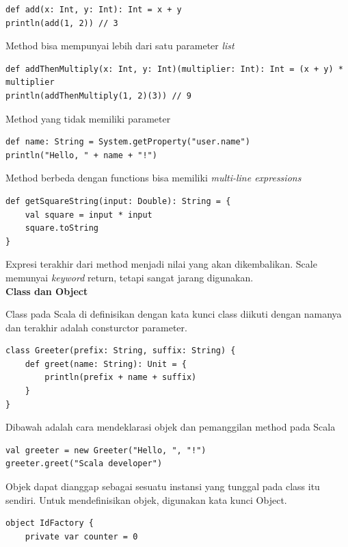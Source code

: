 \documentclass[a4paper,twoside]{article}
\begin{document}
\begin{enumerate}
\begin{verbatim}
def add(x: Int, y: Int): Int = x + y 
println(add(1, 2)) // 3 
\end{verbatim}

Method bisa mempunyai lebih dari satu parameter \textit{list} 

\begin{verbatim}
def addThenMultiply(x: Int, y: Int)(multiplier: Int): Int = (x + y) * multiplier 
println(addThenMultiply(1, 2)(3)) // 9 
\end{verbatim}


Method yang tidak memiliki parameter

\begin{verbatim}
def name: String = System.getProperty("user.name")
println("Hello, " + name + "!")
\end{verbatim}
Method berbeda dengan functions bisa memiliki \textit{multi-line expressions}

\begin{verbatim}
def getSquareString(input: Double): String = {
    val square = input * input
    square.toString
}
\end{verbatim}

Expresi terakhir dari method menjadi nilai yang akan dikembalikan. Scale memunyai \textit{keyword} return, tetapi sangat jarang digunakan.\\

\textbf{Class dan Object}

Class pada Scala di definisikan dengan kata kunci class diikuti dengan namanya dan terakhir adalah consturctor parameter.

\begin{verbatim}
class Greeter(prefix: String, suffix: String) {
    def greet(name: String): Unit = {
        println(prefix + name + suffix)
    }
}
\end{verbatim}



Dibawah adalah cara mendeklarasi objek dan pemanggilan method pada Scala 

\begin{verbatim}
val greeter = new Greeter("Hello, ", "!")
greeter.greet("Scala developer")
\end{verbatim}

Objek dapat dianggap sebagai sesuatu instansi yang tunggal pada class itu sendiri. Untuk mendefinisikan objek, digunakan kata kunci Object. 

\begin{verbatim}
object IdFactory {
    private var counter = 0
  

\end{verbatim}
\end{enumerate}
\end{document}
